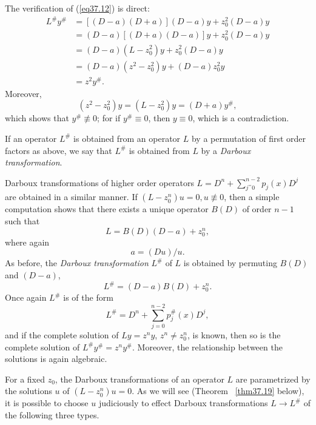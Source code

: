 \documentclass{surv-l}
\theoremstyle{plain}
\theoremstyle{definition}
\numberwithin{equation}{chapter}
\begin{document}
The verification of (\ref{eq37.12}) is direct:
\begin{align*}
L^{\#}y^{\#}&=[(D-a) (D+a)](D-a)y+z_{0}^{2}(D-a)y\\
&=(D-a)[(D+a)(D-a)]y+z_{0}^{2}(D-a)y\\
&=(D-a)(L-z_{0}^{2})y+z_{0}^{2}(D-a)y\\
&=(D-a)(z^{2}-z_{0}^{2})y+(D-a)z_{0}^{2}y\\
&=z^{2}y^{\#}.
\end{align*}
Moreover,
\begin{equation*}
(z^{2}-z_{0}^{2})y=(L-z_{0}^{2})y=(D+a)y^{\#},
\end{equation*}
which shows that $y^{\#}\not\equiv 0$; for if $y^{\#}\equiv 0$, then $y\equiv 0$, which is a contradiction.

If an operator $L^{\#}$ is obtained from an operator $L$ by a permutation of first order factors as above, we say that $L^{\#}$ is obtained from $L$ by a \emph{Darboux transformation}.


Darboux transformations of higher order operators $L=D^{n}+\sum_{j^=0}^{n-2}p_{j}(x)D^{j}$ are obtained in a similar manner. If $(L-z_{0}^{n})u=0,u\not\equiv 0$, then a simple computation shows that there exists a unique operator $B(D)$ of order $n-1$ such that
\begin{equation}\label{eq37.13}
L=B(D)(D-a)+z_{0}^{n},
\end{equation}
where again
\setcounter{equation}{6}
\begin{equation}
a=(Du)/u.
\end{equation}
As before, the \emph{Darboux transformation} $L^{\#}$ of $L$ is obtained by permuting $B(D)$ and $(D-a)$,
\setcounter{equation}{13}
\begin{equation}\label{eq37.14}
L^{\#}=(D-a)B(D)+z_{0}^{n}.
\end{equation}
Once again $L^{\#}$ is of the form
\begin{equation}\label{eq37.15}
L^{\#}=D^{n}+\sum_{j=0}^{n-2}p_{j}^{\#}(x)D^{j},
\end{equation}
and if the complete solution of $Ly=z^{n}y$, $z^{n}\neq z_{0}^{n}$, is known, then so is the complete solution of $L^{\#} y^{\#}=z^{n}y^{\#}$. Moreover, the relationship between the solutions is again algebraic.

For a fixed $z_{0}$, the Darboux transformations of an operator $L$ are parametrized by the solutions $u$ of $(L-z_{0}^{n})u=0$. As we will see (Theorem ~\ref{thm37.19} below), it is possible to choose $u$ judiciously to effect Darboux transformations $L\rightarrow L^{\#}$ of the following three types.
\end{document}
